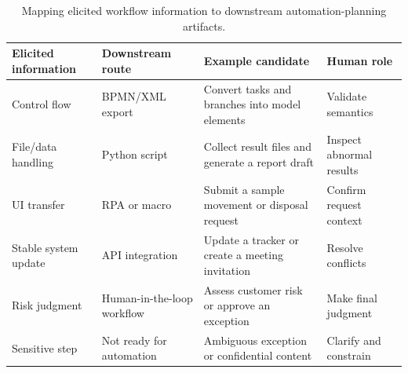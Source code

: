 \begin{table}[!t]
  \caption{Mapping elicited workflow information to downstream automation-planning artifacts.}
  \label{tab:automation-plan}
  \footnotesize
  \setlength{\tabcolsep}{4pt}
  \renewcommand{\arraystretch}{0.96}
  \begin{tabular}{p{}p{}p{}p{}}
    \toprule
    \textbf{Elicited information} &
    \textbf{Downstream route} &
    \textbf{Example candidate} &
    \textbf{Human role} \\
    \midrule
    Control flow &
    BPMN/XML export &
    Convert tasks and branches into model elements &
    Validate semantics \\
    File/data handling &
    Python script &
    Collect result files and generate a report draft &
    Inspect abnormal results \\
    UI transfer &
    RPA or macro &
    Submit a sample movement or disposal request &
    Confirm request context \\
    Stable system update &
    API integration &
    Update a tracker or create a meeting invitation &
    Resolve conflicts \\
    Risk judgment &
    Human-in-the-loop workflow &
    Assess customer risk or approve an exception &
    Make final judgment \\
    Sensitive step &
    Not ready for automation &
    Ambiguous exception or confidential content &
    Clarify and constrain \\
    \bottomrule
  \end{tabular}
\end{table}
